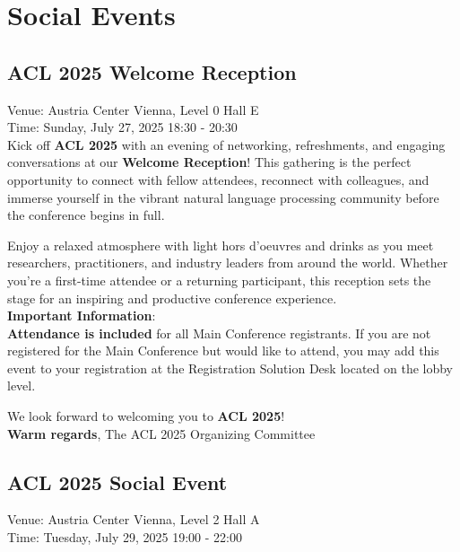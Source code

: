 \chapter{Social Events}

\section{ACL 2025 Welcome Reception}
\vspace*{0.2cm}

Venue: Austria Center Vienna, Level 0 Hall E\\
Time: Sunday, July 27, 2025 18:30 - 20:30\\

Kick off \textbf{ACL 2025} with an evening of networking, refreshments, and engaging conversations at our \textbf{Welcome Reception}! This gathering is the perfect opportunity to connect with fellow attendees, reconnect with colleagues, and immerse yourself in the vibrant natural language processing community before the conference begins in full.

Enjoy a relaxed atmosphere with light hors d’oeuvres and drinks as you meet researchers, practitioners, and industry leaders from around the world. Whether you're a first-time attendee or a returning participant, this reception sets the stage for an inspiring and productive conference experience.\\

\textbf{Important Information}:\\
\textbf{Attendance is included} for all Main Conference registrants.
If you are not registered for the Main Conference but would like to attend, you may add this event to your registration at the Registration Solution Desk located on the lobby level.

We look forward to welcoming you to \textbf{ACL 2025}!\\

\textbf{Warm regards},
The ACL 2025 Organizing Committee

\clearpage

\section{ACL 2025 Social Event}
\vspace*{0.2cm}

Venue: Austria Center Vienna, Level 2 Hall A\\
Time: Tuesday, July 29, 2025 19:00 - 22:00\\

